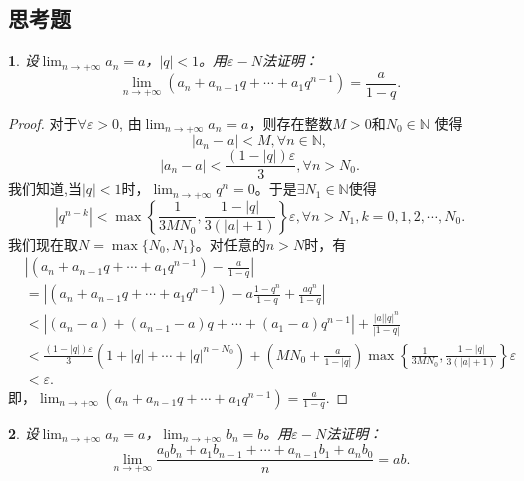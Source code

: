 \documentclass[utf8]{book}
\newtheorem{example}{}[section]             %
\begin{document}
\subsection{思考题}
\begin{example}
设$\displaystyle \lim_{n\to +\infty}a_n = a$，$\left |q \right | < 1$。用$\varepsilon-N$法证明：
$$\displaystyle \lim_{n\to +\infty}(a_n + a_{n-1}q + \cdots + a_1q^{n-1}) = \frac{a}{1-q}.$$
\end{example}
\begin{proof}

对于$\forall \varepsilon > 0$, 由$\displaystyle \lim_{n\to +\infty}a_n = a$，则存在整数$M > 0$和$N_0 \in \mathbb{N}$ 使得
$$\left | a_n - a \right | < M, \forall n\in\mathbb{N},$$
$$\left | a_n - a \right | < \frac{(1-|q|)\varepsilon}{3}, \forall n > N_0.$$
我们知道,当$\left| q\right| < 1$时，$\displaystyle \lim_{n\to +\infty}q^n = 0$。于是$\exists N_1 \in \mathbb {N}$使得
$$\left|q^{n-k}\right| < \max\left \{\frac{1}{3MN_0}, \frac{1-|q|}{3(|a|+1)}\right\}\varepsilon, \forall n > N_1, k=0, 1, 2, \cdots, N_0.$$
我们现在取$N = \max\{N_0, N_1\}$。对任意的$n > N$时，有
\begin{equation*}
\begin{split}
&\left | (a_n + a_{n-1}q + \cdots + a_1q^{n-1}) - \frac{a}{1-q} \right | \\
&= \left | (a_n + a_{n-1}q + \cdots + a_1q^{n-1}) - a\frac{1-q^n}{1-q} + \frac{aq^n}{1-q}\right|\\
&< \left | (a_n - a) + (a_{n-1} - a)q + \cdots + (a_1- a)q^{n-1} \right | + \frac{\left|a\right|\left|q\right|^n}{\left|1-q\right|} \\
&<\frac{(1-|q|)\varepsilon}{3}(1 + |q| + \cdots + |q|^{n-N_0}) + \left(MN_0+\frac{a}{1-|q|}\right)\max\left \{\frac{1}{3MN_0}, \frac{1-|q|}{3(|a|+1)}\right\}
\varepsilon\\&< \varepsilon.
	\end{split}
\end{equation*}
即，$\displaystyle \lim_{n\to +\infty}(a_n + a_{n-1}q + \cdots + a_1q^{n-1}) = \frac{a}{1-q}.$ 

\end{proof}
\begin{example}
设$\displaystyle \lim_{n\to +\infty}a_n = a$，$\displaystyle \lim_{n\to +\infty}b_n = b$。用$\varepsilon-N$法证明：
$$\displaystyle \lim_{n\to +\infty}\frac{a_0b_n+a_1b_{n-1}+\cdots+a_{n-1}b_1+a_nb_0}{n}= ab.$$
\end{example}
\end{document}
